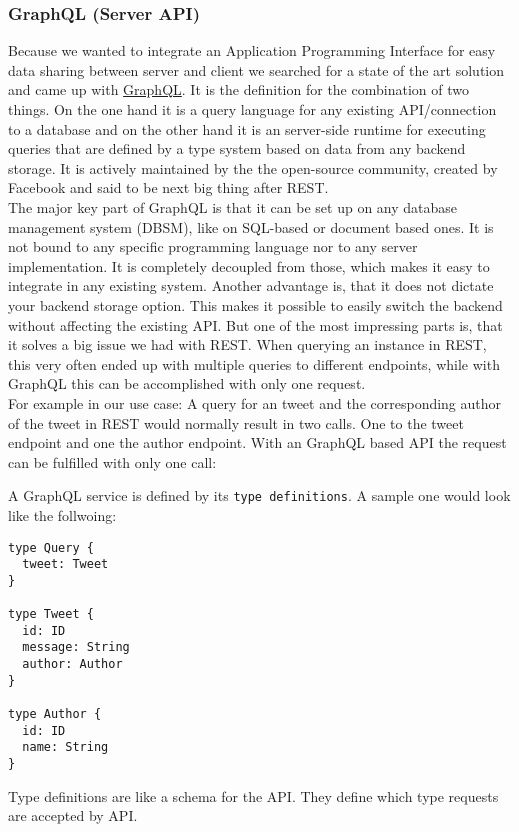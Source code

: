 \documentclass[]{article}
\begin{document}
\subsubsection{GraphQL (Server API)}\label{graphql-server-api}

Because we wanted to integrate an Application Programming Interface for
easy data sharing between server and client we searched for a state of
the art solution and came up with
\href{http://graphql.org/learn/}{GraphQL}. It is the definition for the
combination of two things. On the one hand it is a query language for
any existing API/connection to a database and on the other hand it is an
server-side runtime for executing queries that are defined by a type
system based on data from any backend storage. It is actively maintained
by the the open-source community, created by Facebook and said to be
next big thing after REST.\\
The major key part of GraphQL is that it can be set up on any database
management system (DBSM), like on SQL-based or document based ones. It
is not bound to any specific programming language nor to any server
implementation. It is completely decoupled from those, which makes it
easy to integrate in any existing system. Another advantage is, that it
does not dictate your backend storage option. This makes it possible to
easily switch the backend without affecting the existing API. But one of
the most impressing parts is, that it solves a big issue we had with
REST. When querying an instance in REST, this very often ended up with
multiple queries to different endpoints, while with GraphQL this can be
accomplished with only one request.\\
For example in our use case: A query for an tweet and the corresponding
author of the tweet in REST would normally result in two calls. One to
the tweet endpoint and one the author endpoint. With an GraphQL based
API the request can be fulfilled with only one call:

A GraphQL service is defined by its \texttt{type\ definitions}. A sample
one would look like the follwoing:

\begin{verbatim}
type Query {
  tweet: Tweet
}

type Tweet {
  id: ID
  message: String
  author: Author
}

type Author {
  id: ID
  name: String
}
\end{verbatim}

Type definitions are like a schema for the API. They define which type
requests are accepted by API.
\end{document}
